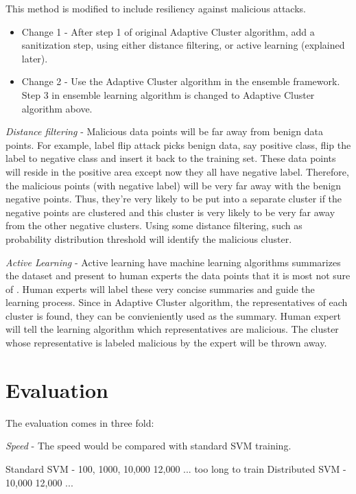 \documentclass[10pt,conference,compsocconf,letterpaper]{IEEEtran}
\begin{document}
This method is modified to include resiliency against malicious attacks.

\begin{itemize}
\item Change 1 - After step 1 of original Adaptive Cluster algorithm, add a sanitization step, using either distance filtering, or active learning (explained later).
\item Change 2 - Use the Adaptive Cluster algorithm in the ensemble framework. Step 3 in ensemble learning algorithm is changed to Adaptive Cluster algorithm above.
\end{itemize}

\textit{Distance filtering} - Malicious data points will be far away from benign data points. For example, label flip attack \cite{xiao12} picks benign data, say positive class, flip the label to negative class and insert it back to the training set. These data points will reside in the positive area except now they all have negative label. Therefore, the malicious points (with negative label) will be very far away with the benign negative points. Thus, they're very likely to be put into a separate cluster if the negative points are clustered and this cluster is very likely to be very far away from the other negative clusters. Using some distance filtering, such as probability distribution threshold will identify the malicious cluster.

\textit{Active Learning} - Active learning have machine learning algorithms summarizes the dataset and present to human experts the data points that it is most not sure of \cite{reghavan06}. Human experts will label these very concise summaries and guide the learning process. Since in Adaptive Cluster algorithm, the representatives of each cluster is found, they can be convieniently used as the summary. Human expert will tell the learning algorithm which representatives are malicious. The cluster whose representative is labeled malicious by the expert will be thrown away.

\section{Evaluation}

The evaluation comes in three fold:

\textit{Speed} - The speed would be compared with standard SVM training.

Standard SVM	- 100, 1000, 10,000 12,000 ... too long to train
Distributed SVM	- 10,000 12,000 ... 
\end{document}
